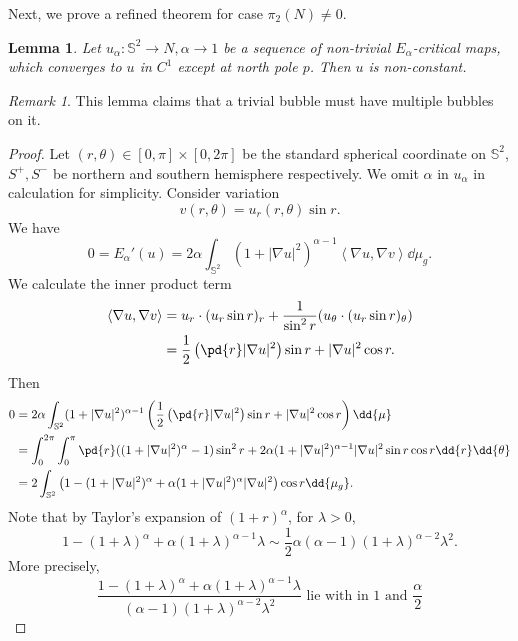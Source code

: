 \documentclass[UTF8,12pt]{article}
\theoremstyle{plain}\newtheorem{theorem}{Theorem}
\theoremstyle{definition}\newtheorem{definition}[theorem]{Definition}
\theoremstyle{definition}\newtheorem{example}[theorem]{Example}
\theoremstyle{plain}\newtheorem{axiom}[theorem]{Axiom}
\theoremstyle{plain}\newtheorem{assertion}[theorem]{Assertion}
\theoremstyle{plain}\newtheorem{corollary}[theorem]{Corollary}
\theoremstyle{plain}\newtheorem{lemma}[theorem]{Lemma}
\theoremstyle{plain}\newtheorem{proposition}[theorem]{Proposition}
\theoremstyle{plain}\newtheorem{prop}[theorem]{Proposition}
\theoremstyle{plain}\newtheorem{conjecture}[theorem]{Conjecture}
\theoremstyle{plain}\newtheorem{conj}[theorem]{Conjecture}
\theoremstyle{plain}\newtheorem{problem}[theorem]{Problem}
\theoremstyle{remark}\newtheorem{notation}[theorem]{Notation}
\theoremstyle{definition}\newtheorem*{question}{Question}
\theoremstyle{definition}\newtheorem*{answer}{Answer}
\theoremstyle{definition}\newtheorem*{goal}{Goal}
\theoremstyle{plain}\newtheorem*{application}{Application}
\theoremstyle{plain}\newtheorem*{exercise}{Exercise}
\theoremstyle{remark}\newtheorem*{remark}{Remark}
\theoremstyle{remark}\newtheorem*{note}{\small{Note}}
\numberwithin{equation}{section}
\numberwithin{theorem}{section}
\numberwithin{figure}{section}
\begin{document}
Next, we prove a refined theorem for case \(\pi_2(N)\neq 0\).
\begin{lemma}\label{lem:no-trivial-bubble}
    Let \(u_\alpha\colon \mathbb{S}^2\to N,\alpha\to 1\) be a sequence of non-trivial
    \(E_\alpha\)-critical maps, which converges to \(u\) in \(C^1\) except at north
    pole \(p\). Then \(u\) is non-constant.
\end{lemma}
\begin{remark}
    This lemma claims that a trivial bubble must have multiple bubbles on it.
\end{remark}
\begin{proof}
    Let \((r,\theta)\in [0,\pi]\times [0,2\pi]\) be the standard spherical
    coordinate on \(\mathbb{S}^2\), \(S^+,S^-\) be northern and southern hemisphere
    respectively. We omit \(\alpha\) in \(u_\alpha\) in calculation for simplicity.
    Consider variation \[
        v(r,\theta)=u_r(r,\theta)\sin r
    .\] We have \[
        0=E_\alpha'(u)=2\alpha\int_{\mathbb{S}^2}(1+|\nabla u|^2)^{\alpha-1}
        \left<\nabla u,\nabla v\right> \dd{\mu_g}
    .\] We calculate the inner product term
    \begin{align*}
        \left<\nabla u,\nabla v\right> 
        &=u_r\cdot (u_r\sin r)_r+\frac{1}{\sin^2 r}
        (u_\theta\cdot (u_r\sin r)_{\theta}) \\
        &=\frac{1}{2}\left(\pd{r}|\nabla u|^2\right)\sin r
        +|\nabla u|^2\cos r
    .\end{align*}
    Then
    \begin{align*}
        0&=2\alpha\int_{\mathbb{S}^2}(1+|\nabla u|^2)^{\alpha-1}\left(
        \frac{1}{2}\left(\pd{r}|\nabla u|^2\right)\sin r+|\nabla u|^2\cos r\right)
        \dd{\mu} \\
        &=\int_{0}^{2\pi}\int_{0}^{\pi}\pd{r}((1+|\nabla u|^2)^\alpha-1)\sin^2 r
        +2\alpha(1+|\nabla u|^2)^{\alpha-1}|\nabla u|^2\sin r\cos r\dd{r}\dd{\theta}\\
        &=2\int_{\mathbb{S}^2}\left(1-(1+|\nabla u|^2)^\alpha+
        \alpha(1+|\nabla u|^2)^\alpha|\nabla u|^2\right)\cos r\dd{\mu_g}
    .\end{align*}
    Note that by Taylor's expansion of \((1+r)^\alpha\), for \(\lambda>0\), \[
        1-(1+\lambda)^\alpha+\alpha(1+\lambda)^{\alpha-1}\lambda\sim
        \frac{1}{2}\alpha(\alpha-1)(1+\lambda)^{\alpha-2}\lambda^2
    .\] More precisely, \[
    \frac{1-(1+\lambda)^\alpha+\alpha(1+\lambda)^{\alpha-1}\lambda}
    {(\alpha-1)(1+\lambda)^{\alpha-2}\lambda^2}
    \text{ lie with in }1\text{ and }\frac{\alpha}{2}
\]
\end{proof}
\end{document}
